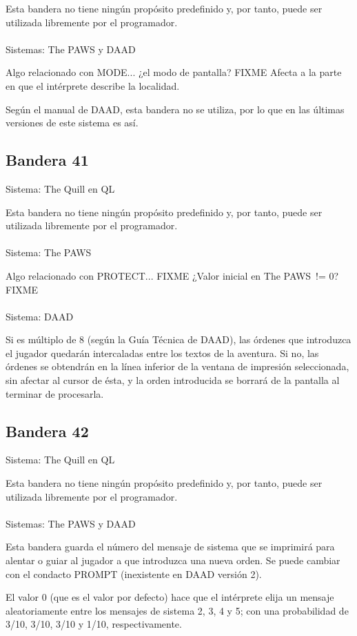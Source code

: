 \documentclass[11pt, a5paper]{article}
\newcommand{\quill}{\textsf{The Quill}\xspace}
\newcommand{\paw}{\textsf{The PAWS}\xspace}
\newcommand{\daad}{\textsf{DAAD}\xspace}
\newcommand{\sistema}[1]{\noindent Sistema: #1 \nopagebreak}
\newcommand{\sistemas}[1]{\noindent Sistemas: #1 \nopagebreak}
\begin{document}
Esta bandera no tiene ningún propósito predefinido y, por tanto, puede ser utilizada libremente por el programador.
\\\ \\
\sistemas{\paw y \daad}

Algo relacionado con MODE... ¿el modo de pantalla? FIXME
Afecta a la parte en que el intérprete describe la localidad.

Según el manual de \daad, esta bandera no se utiliza, por lo que en las últimas versiones de este sistema es así.

\subsection{Bandera 41}

\sistema{\quill en QL}

Esta bandera no tiene ningún propósito predefinido y, por tanto, puede ser utilizada libremente por el programador.
\\\ \\
\sistema{\paw}

Algo relacionado con PROTECT... FIXME
¿Valor inicial en \paw\ != 0? FIXME
\\\ \\
\sistema{\daad}

Si es múltiplo de 8 (según la Guía Técnica de \daad \cite[pág. 61]{DAAD}), las órdenes que introduzca el jugador quedarán intercaladas entre los textos de la aventura. Si no, las órdenes se obtendrán en la línea inferior de la ventana de impresión seleccionada, sin afectar al cursor de ésta, y la orden introducida se borrará de la pantalla al terminar de procesarla.

\subsection{Bandera 42}

\sistema{\quill en QL}

Esta bandera no tiene ningún propósito predefinido y, por tanto, puede ser utilizada libremente por el programador.
\\\ \\
\sistemas{\paw y \daad}

Esta bandera guarda el número del mensaje de sistema que se imprimirá para alentar o guiar al jugador a que introduzca una nueva orden. Se puede cambiar con el condacto PROMPT (inexistente en \daad versión 2).

El valor 0 (que es el valor por defecto) hace que el intérprete elija un mensaje aleatoriamente entre los mensajes de sistema 2, 3, 4 y 5; con una probabilidad de 3/10, 3/10, 3/10 y 1/10, respectivamente.
\end{document}
